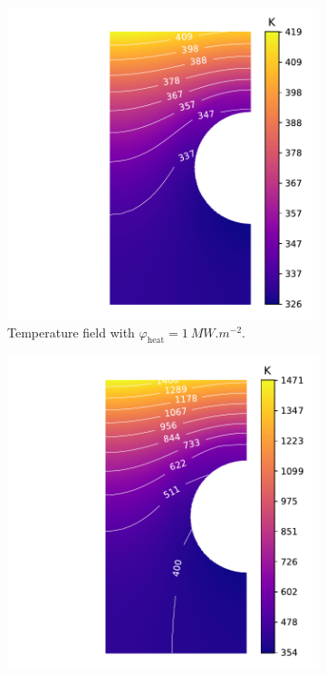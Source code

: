 \begin{figure} [h!]
    \centering
    \begin{subfigure}{0.4\linewidth}
        \centering
        \includegraphics[width=\linewidth]{Figures/Chapter3/monoblocks/parametric_study/T_1e6.pdf}
        \caption{Temperature field with $\varphi_\mathrm{heat} = \SI{1}{MW.m^{-2}}$.}
    \end{subfigure}%
    \begin{subfigure}{0.4\linewidth}
        \centering
        \includegraphics[width=\linewidth]{Figures/Chapter3/monoblocks/parametric_study/T_1e7.pdf}

\end{subfigure}
\end{figure}
